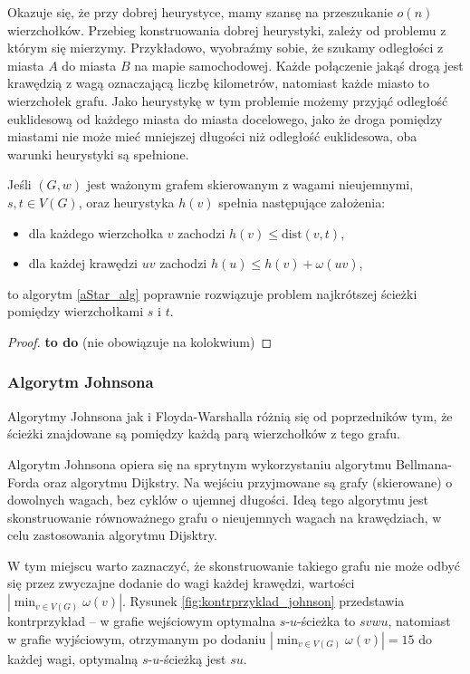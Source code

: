 Okazuje się, że przy dobrej heurystyce, mamy szansę na 
przeszukanie $o(n)$ wierzchołków. Przebieg konstruowania
dobrej heurystyki, zależy od problemu z którym się mierzymy. 
Przykładowo, wyobraźmy sobie, że szukamy odległości z miasta $A$
do miasta $B$ na mapie samochodowej. Każde połączenie jakąś drogą
jest krawędzią z wagą oznaczającą liczbę kilometrów, natomiast
każde miasto to wierzchołek grafu. Jako heurystykę w tym problemie 
możemy przyjąć odległość euklidesową od każdego miasta
do miasta docelowego, jako że droga pomiędzy miastami nie może mieć 
mniejszej długości niż odległość euklidesowa, oba warunki
heurystyki są spełnione.

\begin{theorem}
	 Jeśli
	$(G, w)$ jest ważonym grafem skierowanym
	z wagami nieujemnymi,
	$s,t \in V(G)$, oraz heurystyka $h(v)$
	spełnia następujące założenia:
	\begin{itemize}
		\item dla każdego wierzchołka $v$ zachodzi $h(v) \leq \text{dist}(v, t)$,
		\item dla każdej krawędzi $uv$ zachodzi $h(u) \leq h(v) + \omega(uv)$,
	\end{itemize}
	to algorytm \ref{aStar_alg}
	poprawnie rozwiązuje problem najkrótszej ścieżki
	pomiędzy wierzchołkami $s$ i $t$.
	\begin{proof}
		\textbf{to do} (nie obowiązuje na kolokwium)
	\end{proof}
	\label{aStar_proof}
\end{theorem}

\subsubsection{Algorytm Johnsona}
Algorytmy Johnsona jak i Floyda-Warshalla 
różnią się od poprzedników tym, że
ścieżki znajdowane są pomiędzy każdą parą
wierzchołków z tego grafu.

Algorytm Johnsona opiera się na sprytnym wykorzystaniu
algorytmu Bellmana-Forda oraz algorytmu Dijkstry. Na 
wejściu przyjmowane są grafy (skierowane) o dowolnych
wagach, bez cyklów o ujemnej długości. Ideą tego
algorytmu jest skonstruowanie równoważnego 
grafu o nieujemnych wagach na krawędziach,
w celu zastosowania algorytmu Dijsktry.

W tym miejscu warto zaznaczyć, że skonstruowanie takiego
grafu nie może odbyć się przez zwyczajne dodanie
do wagi każdej krawędzi, wartości $|\min_{v \in V(G)}{\omega(v)}|$. 
Rysunek \ref{fig:kontrprzyklad_johnson}
przedstawia kontrprzykład -- w grafie wejściowym
optymalna $s$-$u$-ścieżka to $svwu$, natomiast
w grafie wyjściowym, otrzymanym po dodaniu
$|\min_{v \in V(G)}{\omega(v)}| = 15$ do każdej 
wagi, optymalną $s$-$u$-ścieżką jest $su$.

